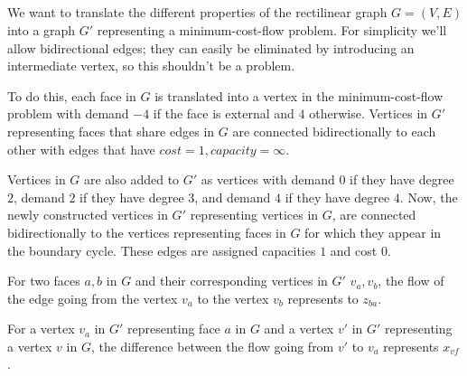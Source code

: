 
\subsection{}

We want to translate the different properties of the rectilinear graph
$G = (V, E)$ into a graph $G'$ representing a minimum-cost-flow
problem. For simplicity we'll allow bidirectional edges; they can
easily be eliminated by introducing an intermediate vertex, so this
shouldn't be a problem.

To do this, each face in $G$ is translated into a vertex in the
minimum-cost-flow problem with demand $-4$ if the face is external and
$4$ otherwise. Vertices in $G'$ representing faces that share edges in
$G$ are connected bidirectionally to each other with edges that have $cost = 1,
capacity = \infty $.

Vertices in $G$ are also added to $G'$ as vertices with demand $0$ if
they have degree $2$, demand $2$ if they have degree $3$, and demand
$4$ if they have degree $4$. Now, the newly constructed vertices in
$G'$ representing vertices in $G$, are connected bidirectionally to
the vertices representing faces in $G$ for which they appear in the
boundary cycle. These edges are assigned capacities $1$ and cost $0$.

For two faces $a,b$ in $G$ and their corresponding vertices in $G'$
$v_a, v_b$, the flow of the edge going from the vertex $v_a$ to the
vertex $v_b$ represents to $z_{ba}$.

For a vertex $v_a$ in $G'$ representing face $a$ in $G$ and a vertex
$v'$ in $G'$ representing a vertex $v$ in $G$, the difference between
the flow going from $v'$ to $v_a$ represents $x_{vf}$.
